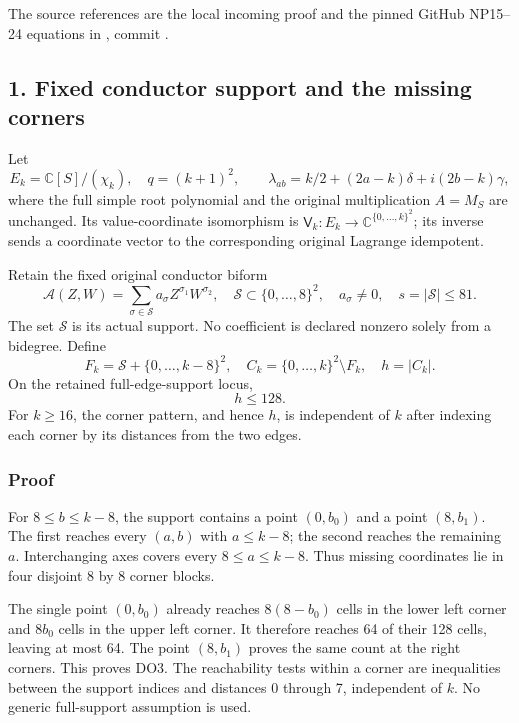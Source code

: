 \documentclass[11pt]{article}
\begin{document}
The source references are the local incoming proof  and the pinned GitHub NP15--24 equations in , commit .

\subsection{1. Fixed conductor support and the missing corners}\label{pdepth:fixed-conductor-support-and-the-missing-corners}

Let \[
E_k=\mathbb C[S]/(\chi_k),\quad q=(k+1)^2,\qquad
\lambda_{ab}=k/2+(2a-k)\delta+i(2b-k)\gamma,
\] where the full simple root polynomial and the original multiplication \(A=M_S\) are unchanged. Its value-coordinate isomorphism is \(\mathsf V_k:E_k\to\mathbb C^{\{0,\ldots,k\}^2}\); its inverse sends a coordinate vector to the corresponding original Lagrange idempotent.

Retain the fixed original conductor biform \[
\mathcal A(Z,W)=\sum_{\sigma\in\mathcal S}a_\sigma
Z^{\sigma_1}W^{\sigma_2},\quad
\mathcal S\subset\{0,\ldots,8\}^2,\quad a_\sigma\ne0,
\quad s=|\mathcal S|\le81.
\tag{DO1}
\] The set \(\mathcal S\) is its actual support. No coefficient is declared nonzero solely from a bidegree. Define \[
F_k=\mathcal S+\{0,\ldots,k-8\}^2,\quad
C_k=\{0,\ldots,k\}^2\setminus F_k,\quad h=|C_k|.
\tag{DO2}
\] On the retained full-edge-support locus, \[
\boxed{h\le128.}\tag{DO3}
\] For \(k\ge16\), the corner pattern, and hence \(h\), is independent of \(k\) after indexing each corner by its distances from the two edges.

\subsubsection{Proof}\label{pdepth:proof}

For \(8\le b\le k-8\), the support contains a point \((0,b_0)\) and a point \((8,b_1)\). The first reaches every \((a,b)\) with \(a\le k-8\); the second reaches the remaining \(a\). Interchanging axes covers every \(8\le a\le k-8\). Thus missing coordinates lie in four disjoint 8 by 8 corner blocks.

The single point \((0,b_0)\) already reaches \(8(8-b_0)\) cells in the lower left corner and \(8b_0\) cells in the upper left corner. It therefore reaches 64 of their 128 cells, leaving at most 64. The point \((8,b_1)\) proves the same count at the right corners. This proves DO3. The reachability tests within a corner are inequalities between the support indices and distances 0 through 7, independent of \(k\). No generic full-support assumption is used.
\end{document}
